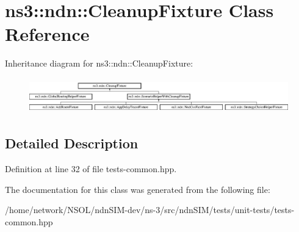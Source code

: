 \hypertarget{classns3_1_1ndn_1_1CleanupFixture}{}\section{ns3\+:\+:ndn\+:\+:Cleanup\+Fixture Class Reference}
\label{classns3_1_1ndn_1_1CleanupFixture}
Inheritance diagram for ns3\+:\+:ndn\+:\+:Cleanup\+Fixture\+:\begin{figure}[H]
\begin{center}
\leavevmode
\includegraphics[height=1.544118cm]{classns3_1_1ndn_1_1CleanupFixture}
\end{center}
\end{figure}


\subsection{Detailed Description}


Definition at line 32 of file tests-\/common.\+hpp.



The documentation for this class was generated from the following file\+:\begin{DoxyCompactItemize}
\item 
/home/network/\+N\+S\+O\+L/ndn\+S\+I\+M-\/dev/ns-\/3/src/ndn\+S\+I\+M/tests/unit-\/tests/tests-\/common.\+hpp\end{DoxyCompactItemize}
